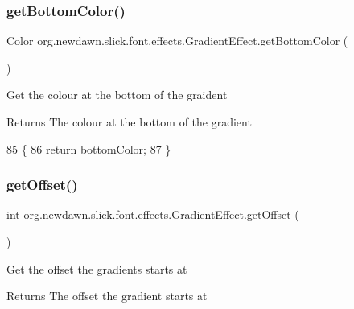 \subsubsection{\texorpdfstring{get\+Bottom\+Color()}{getBottomColor()}}
{\footnotesize\ttfamily Color org.\+newdawn.\+slick.\+font.\+effects.\+Gradient\+Effect.\+get\+Bottom\+Color (\begin{DoxyParamCaption}{ }\end{DoxyParamCaption})\hspace{0.3cm}{\ttfamily [inline]}}

Get the colour at the bottom of the graident

\begin{DoxyReturn}{Returns}
The colour at the bottom of the gradient 
\end{DoxyReturn}

\begin{DoxyCode}
85                                    \{
86         \textcolor{keywordflow}{return} \mbox{\hyperlink{classorg_1_1newdawn_1_1slick_1_1font_1_1effects_1_1_gradient_effect_afc1661928816b8210b1fe9d6f43c74c8}{bottomColor}};
87     \}
\end{DoxyCode}
\mbox{\label{classorg_1_1newdawn_1_1slick_1_1font_1_1effects_1_1_gradient_effect_a7f6294f3f1e2f281f3db8ad6cf824359}} 
\subsubsection{\texorpdfstring{get\+Offset()}{getOffset()}}
{\footnotesize\ttfamily int org.\+newdawn.\+slick.\+font.\+effects.\+Gradient\+Effect.\+get\+Offset (\begin{DoxyParamCaption}{ }\end{DoxyParamCaption})\hspace{0.3cm}{\ttfamily [inline]}}

Get the offset the gradients starts at

\begin{DoxyReturn}{Returns}
The offset the gradient starts at 
\end{DoxyReturn}


